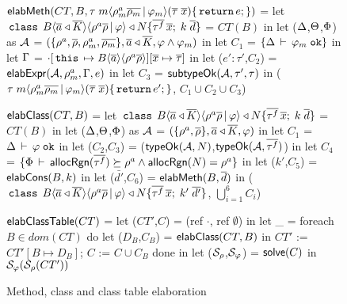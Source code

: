 \newcommand{\hdOf}[2]{\C{class}\; #1\angAlpha\inang{\rhoalloc\rhobar \,|\, #2} \extends \fbN}
\begin{figure}

\begin{codeml}
${\sf elabMeth}(CT, B, \tau \; m\langle \rho^a_m\overline{\rho_m} \,|\, \varphi_m \rangle (\overline{\tau} \; \overline{x})\{\,{\tt return}\, e;\})$ = 
  let $\hdOf{B}{\varphi}\{\bar{\tau^f}\,\xbar;\;k\;\bar{d}\}$ = $CT(B)$ in
  let ($\Delta$,$\Theta$,$\Phi$) as ${\mathcal{A}}$ = 
            $(\{\rho^a,\overline{\rho},\rho^a_m,\overline{\rho_m}\},\overline{a} \triangleleft \overline{K},\varphi \wedge \varphi_m)$ in
  let $C_1$ = $\{\Delta\,\vdash\,\varphi_m \; \texttt{ok}\}$ in
  let $\Gamma$ = $\cdot[\,{\tt this}\, \mapsto B\langle \overline{a} \rangle\langle \rho^a\overline{\rho} \rangle][\overline{x} \mapsto \overline{\tau}]$ in
  let ($e':\tau'$,$C_2$) = ${\sf elabExpr} ({\mathcal{A}},\rho^a_m,\Gamma,e)$ in
  let $C_3$ = ${\sf subtypeOk}({{\mathcal{A}}},{\tau'},{\tau})$ in
    ($\tau \; m\langle \rho^a_m\overline{\rho_m} \,|\, \varphi_m \rangle (\overline{\tau} \;
    \overline{x})\{\,{\tt return}\, e';\}$, $C_1 \cup C_2 \cup C_3$)
\end{codeml}

\begin{codeml}
${\sf elabClass}(CT,B)$ = 
  let $\hdOf{B}{\varphi}\{\bar{\tau^f}\,\xbar;\;k\;\bar{d}\}$ = $CT(B)$ in
  let ($\Delta$,$\Theta$,$\Phi$) as ${\mathcal{A}}$ = $(\{\rho^a,\overline{\rho}\},\overline{a} \triangleleft \overline{K},\varphi)$ in
  let $C_1$ = $\Delta\,\vdash\,\varphi \; \texttt{ok}$ in
  let ($C_2$,$C_3$) = (${\sf typeOk}({{\mathcal{A}}},{N})$,${\sf typeOk}({{\mathcal{A}}},{\overline{\tau^f}})$) in
  let $C_4$ = $\{\Phi\,\vdash\,{\sf allocRgn}(\overline{\tau^f}) \succeq \rho^a \wedge {\sf allocRgn}(N) = \rho^a\}$ in
  let ($k'$,$C_5$) = ${\sf elabCons}(B,k)$ in
  let ($\bar{d'}$,$C_6$) = ${\sf elabMeth}(B,\overline{d})$ in
    ($\hdOf{B}{\varphi}\{\bar{\tau^f}\,\xbar;\;k'\;\bar{d'}\}$, $\bigcup_{i=1}^6 C_i$)
\end{codeml}

\begin{codeml}
${\sf elabClassTable}(CT)$ = 
  let ($CT'$,$C$) = (ref $\cdot$, ref $\emptyset$) in
  let _ = foreach $B \in dom(CT)$ do
            let ($D_B$,$C_B$) = ${\sf elabClass}(CT,B)$ in
              $CT'$ := $CT'[B \mapsto D_B]$;
              $C$ := $C \cup C_B$
           done in
  let ($\mathcal{S}_\rho$,$\mathcal{S}_\varphi$) = ${\sf solve}(C)$ in
    $\mathcal{S}_\varphi(\mathcal{S}_\rho(CT')) $
      
\end{codeml}

\caption{Method, class and class table elaboration}
\label{fig:fb-elabmeth}
\end{figure}
